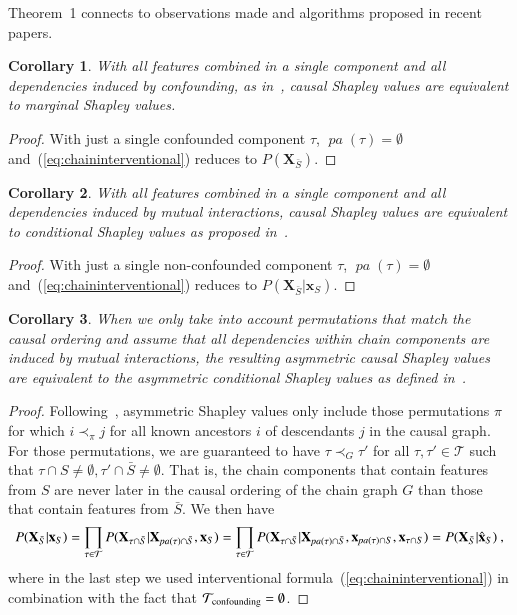 \documentclass{article}
\newcommand{\vX}{\mathbf{X}}
\newcommand{\vx}{\mathbf{x}}
\newcommand{\svdo}[1]{\hat{\vx}_{#1}}
\newcommand{\pa}{\mathop{\textit{pa}}}
\newcommand{\spa}{\mathop{\textit{\scriptsize pa}}}
\newcommand{\perm}{\pi}
\newcommand{\onder}[2]{{#1}_{\mbox{\scriptsize #2}}}
\newcommand{\chaincomponents}{{\cal T}}
\newtheorem{corollary}{Corollary}
\begin{document}
Theorem~1 connects to observations made and algorithms proposed in recent papers.
\begin{corollary}
	With all features combined in a single component and all dependencies induced by confounding, as in~\cite{janzing2019feature}, causal Shapley values are equivalent to marginal Shapley values. 
\end{corollary}
\begin{proof}
	With just a single confounded component $\tau$, $\pa(\tau) = \emptyset$ and~(\ref{eq:chaininterventional}) reduces to $P(\vX_{\bar{S}})$.
\end{proof}
\begin{corollary}
	With all features combined in a single component and all dependencies induced by mutual interactions, causal Shapley values are equivalent to conditional Shapley values as proposed in~\cite{aas2019explaining}.
\end{corollary}
\begin{proof}
	With just a single non-confounded component $\tau$, $\pa(\tau) = \emptyset$ and~(\ref{eq:chaininterventional}) reduces to $P(\vX_{\bar{S}}|\vx_{S})$.
\end{proof}
\begin{corollary}
	When we only take into account permutations that match the causal ordering and assume that all dependencies within chain components are induced by mutual interactions, the resulting asymmetric causal Shapley values are equivalent to the asymmetric conditional Shapley values as defined in~\cite{frye2019asymmetric}.
\end{corollary}
\begin{proof}
	Following~\cite{frye2019asymmetric}, asymmetric Shapley values only include those permutations $\perm$ for which $i \prec_\perm j$ for all known ancestors $i$ of descendants $j$ in the causal graph. For those permutations, we are guaranteed to have $\tau \prec_G \tau'$ for all $\tau, \tau' \in \mathcal{T}$ such that $\tau \cap S \neq \emptyset, \tau' \cap \bar{S} \neq \emptyset$. That is, the chain components that contain features from $S$ are never later in the causal ordering of the chain graph $G$ than those that contain features from $\bar{S}$. We then have
	\[
	P(\vX_{\bar{S}}|\vx_S) = \prod_{\tau \in \chaincomponents} P(\vX_{\tau \cap \bar{S}}|\vX_{\spa(\tau)  \cap \bar{S}},\vx_{S}) = \prod_{\tau \in \chaincomponents} P(\vX_{\tau \cap \bar{S}}|\vX_{\spa(\tau)  \cap \bar{S}},\vx_{\spa(\tau) \cap S},\vx_{\tau \cap S}) = P(\vX_{\bar{S}}|\svdo{S}) \: ,
	\]
	where in the last step we used interventional formula~(\ref{eq:chaininterventional}) in combination with the fact that $\onder{\chaincomponents}{confounding} = \emptyset$.
\end{proof}
\end{document}
